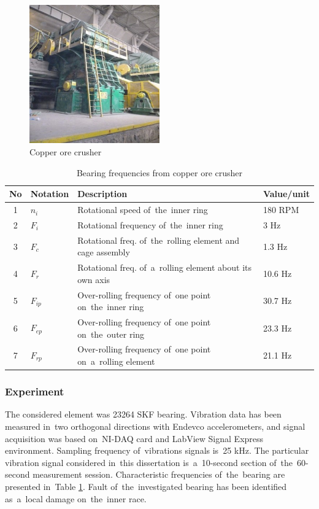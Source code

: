\begin{figure}[ht!]
\centering
\includegraphics[width=0.5\textwidth]{wykresy/obj_crusher.jpg}
\caption{Copper ore crusher}
\label{fig:obj_crusher}
\end{figure}

\begin{table}
	\begin{center}
\begin{tabular}{|c|l|l|l|}
	\hline
   No & Notation & Description & Value/unit \\ \hline
	1 & $n_i$ & Rotational speed of~the~inner ring & 180 RPM \\ \hline
	2 & $F_i$ & Rotational frequency of~the~inner ring & 3 Hz \\ \hline
	3 & $F_c$ & Rotational freq. of~the~rolling element and cage assembly & 1.3 Hz \\ \hline
	4 & $F_r$ & Rotational freq. of~a~rolling element about its own axis & 10.6 Hz \\ \hline
	5 & $F_{ip}$ & Over-rolling frequency of~one point on~the~inner ring & 30.7 Hz \\ \hline
	6 & $F_{ep}$ & Over-rolling frequency of~one point on~the~outer ring & 23.3 Hz \\ \hline
	7 & $F_{rp}$ & Over-rolling frequency of~one point on~a~rolling element & 21.1 Hz \\ \hline
\end{tabular}
\end{center} 
\caption{Bearing frequencies from copper ore crusher}
\label{krusz_table}
\end{table}

\subsubsection{Experiment}
The considered element was 23264 SKF bearing. Vibration data has been measured in~two orthogonal directions with Endevco accelerometers, and signal acquisition was based on~NI-DAQ card and LabView Signal Express environment. Sampling frequency of~vibrations signals is~25 kHz. The particular vibration signal considered in~this dissertation is~a~10-second section of~the~60-second measurement session. Characteristic frequencies of~the~bearing are presented in~Table \ref{krusz_table}. Fault of~the~investigated bearing has been identified as~a~local damage on~the~inner race.


